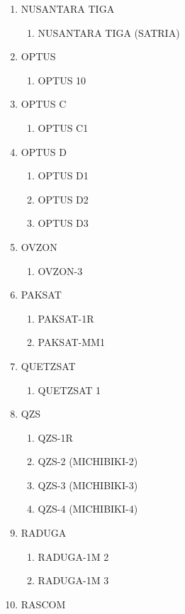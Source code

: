 \begin{multicols}{2}
\begin{enumerate}
  \item NUSANTARA TIGA
  \begin{enumerate}
    \item NUSANTARA TIGA (SATRIA)
  \end{enumerate}
  \item OPTUS
  \begin{enumerate}
    \item OPTUS 10
  \end{enumerate}
  \item OPTUS C
  \begin{enumerate}
    \item OPTUS C1
  \end{enumerate}
  \item OPTUS D
  \begin{enumerate}
    \item OPTUS D1
    \item OPTUS D2
    \item OPTUS D3
  \end{enumerate}
  \item OVZON
  \begin{enumerate}
    \item OVZON-3
  \end{enumerate}
  \item PAKSAT
  \begin{enumerate}
    \item PAKSAT-1R
    \item PAKSAT-MM1
  \end{enumerate}
  \item QUETZSAT
  \begin{enumerate}
    \item QUETZSAT 1
  \end{enumerate}
  \item QZS
  \begin{enumerate}
    \item QZS-1R
    \item QZS-2 (MICHIBIKI-2)
    \item QZS-3 (MICHIBIKI-3)
    \item QZS-4 (MICHIBIKI-4)
  \end{enumerate}
  \item RADUGA
  \begin{enumerate}
    \item RADUGA-1M 2
    \item RADUGA-1M 3
  \end{enumerate}
  \item RASCOM

\end{enumerate}
\end{multicols}
